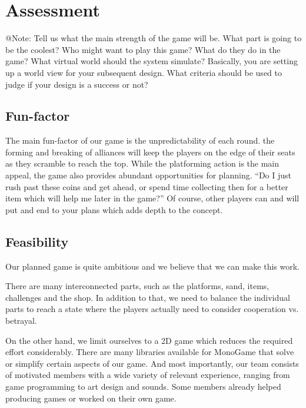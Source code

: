 
\section{Assessment}



\begin{TempText}
	@Note: Tell us what the main strength of the game will be. What part is going to be the coolest? Who might want to play this game? What do they do in the game? What virtual world should the system simulate? Basically, you are setting up a world view for your subsequent design. What criteria should be used to judge if your design is a success or not?
\end{TempText}

\subsection{Fun-factor}
The main fun-factor of our game is the unpredictability of each round. the forming and breaking
of alliances will keep the players on the edge of their seats as they scramble to reach the top.
While the platforming action is the main appeal, the game also provides abundant opportunities
for planning. “Do I just rush past these coins and get ahead, or spend time collecting then for
a better item which will help me later in the game?” Of course, other players can and will put
and end to your plans which adds depth to the concept.


\subsection{Feasibility}
Our planned game is quite ambitious and we believe that we can make this work.

There are many interconnected parts, such as the platforms, sand, items, challenges and the shop.
In addition to that, we need to balance the individual parts to reach a state where the players actually need to consider cooperation vs. betrayal.

On the other hand, we limit ourselves to a 2D game which reduces the required effort considerably.
There are many libraries available for MonoGame that solve or simplify certain aspects of our game.
And most importantly, our team consists of motivated members with a wide variety of relevant experience, ranging from game programming to art design and sounds.
Some members already helped producing games or worked on their own game.

